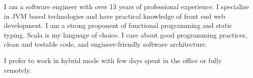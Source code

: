 \documentclass[9pt]{developercv}
\begin{document}
\vspace{0.5cm}



\begin{minipage}[t]{0.45\textwidth}
	\vspace{-\baselineskip} %
	
	I am a software engineer with over 13 years of professional experience. I specialize in JVM based technologies and have practical knowledge of front end web development. I am a strong proponent of functional programming and static typing. Scala is my language of choice. I care about good programming practices, clean and testable code, and engineer-friendly software architecture.

    I prefer to work in hybrid mode with few days spent in the office or fully remotely.
\end{minipage}
\hfill %
\begin{minipage}[t]{0.5\textwidth}
	\vspace{-\baselineskip} %
	\begin{barchart}{5.5}
	\end{barchart}
\end{minipage}

\begin{center}
\end{center}


\end{document}
